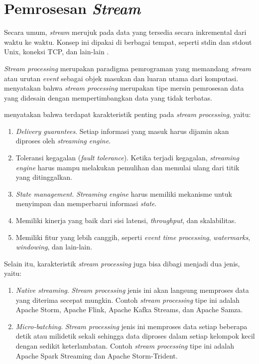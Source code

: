 \section{Pemrosesan \textit{Stream}}

Secara umum, \textit{stream} merujuk pada data yang tersedia secara inkremental dari waktu ke waktu. Konsep ini dipakai di berbagai tempat, seperti stdin dan stdout Unix, koneksi TCP, dan lain-lain \parencite{dataIntensiveApplications}.

\textit{Stream processing} merupakan paradigma pemrograman yang memandang \textit{stream} atau urutan \textit{event} sebagai objek masukan dan luaran utama dari komputasi. \cite{streaming101} menyatakan bahwa \textit{stream processing} merupakan tipe mersin pemrosesan data yang didesain dengan mempertimbangkan data yang tidak terbatas.

\cite{streamProcessingComparison} menyatakan bahwa terdapat karakteristik penting pada \textit{stream processing}, yaitu:

\begin{enumerate}
    \item \textit{Delivery guarantees}. Setiap informasi yang masuk harus dijamin akan diproses oleh \textit{streaming engine}.
    \item Toleransi kegagalan (\textit{fault tolerance}). Ketika terjadi kegagalan, \textit{streaming engine} harus mampu melakukan pemulihan dan memulai ulang dari titik yang ditinggalkan.
    \item \textit{State management}. \textit{Streaming engine} harus memiliki mekanisme untuk menyimpan dan memperbarui informasi \textit{state}.
    \item Memiliki kinerja yang baik dari sisi latensi, \textit{throughput}, dan skalabilitas.
    \item Memiliki fitur yang lebih canggih, seperti \textit{event time processing}, \textit{watermarks}, \textit{windowing}, dan lain-lain.
\end{enumerate}

Selain itu, karakteristik \textit{stream processing} juga bisa dibagi menjadi dua jenis, yaitu:

\begin{enumerate}
    \item \textit{Native streaming}. \textit{Stream processing} jenis ini akan langsung memproses data yang diterima secepat mungkin. Contoh \textit{stream processing} tipe ini adalah Apache Storm, Apache Flink, Apache Kafka Streams, dan Apache Samza.
    \item \textit{Micro-batching}. \textit{Stream processing} jenis ini memproses data setiap beberapa detik atau milidetik sekali sehingga data diproses dalam setiap kelompok kecil dengan sedikit keterlambatan. Contoh \textit{stream processing} tipe ini adalah Apache Spark Streaming dan Apache Storm-Trident.
\end{enumerate}

